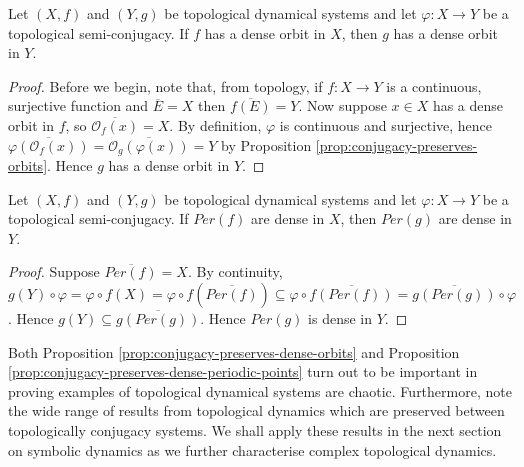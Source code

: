 \begin{prop} \label{prop:conjugacy-preserves-dense-orbits}
    Let $(X, f)$ and $(Y, g)$ be topological dynamical systems and let $\varphi: X \to Y$ be a topological semi-conjugacy. If $f$ has a dense orbit in $X$, then $g$ has a dense orbit in $Y$.
    \begin{proof}
        Before we begin, note that, from topology, if $f: X \to Y$ is a continuous, surjective function and $\overline{E} = X$ then $\overline{f(E)} = Y$. Now suppose $x \in X$ has a dense orbit in $f$, so $\overline{\mathcal{O}_f(x)} = X$. By definition, $\varphi$ is continuous and surjective, hence $\overline{\varphi(\mathcal{O}_{f}(x))} = \overline{\mathcal{O}_{g}(\varphi(x))} = Y$ by Proposition \ref{prop:conjugacy-preserves-orbits}. Hence $g$ has a dense orbit in $Y$.
    \end{proof}
\end{prop}

\begin{prop} \label{prop:conjugacy-preserves-dense-periodic-points}
    Let $(X, f)$ and $(Y,g)$ be topological dynamical systems and let $\varphi: X \to Y$ be a topological semi-conjugacy. If $Per(f)$ are dense in $X$, then $Per(g)$ are dense in $Y$.
    \begin{proof}
        Suppose $\overline{Per(f)} = X$. By continuity, $g(Y) \circ \varphi = \varphi \circ f(X) = \varphi \circ f(\overline{Per(f)}) \subseteq \varphi \circ \overline{f(Per(f))} = \overline{g(Per(g))} \circ \varphi$. Hence $g(Y) \subseteq \overline{g(Per(g))}$. Hence $Per(g)$ is dense in $Y$.
    \end{proof}
\end{prop}

Both Proposition \ref{prop:conjugacy-preserves-dense-orbits} and Proposition \ref{prop:conjugacy-preserves-dense-periodic-points} turn out to be important in proving examples of topological dynamical systems are chaotic. Furthermore, note the wide range of results from topological dynamics which are preserved between topologically conjugacy systems. We shall apply these results in the next section on symbolic dynamics as we further characterise complex topological dynamics.

